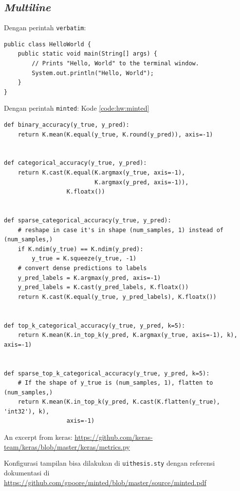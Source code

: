     \subsection{\textit{Multiline}}

    Dengan perintah \verb|verbatim|:

    \begin{verbatim}	
public class HelloWorld {
    public static void main(String[] args) {
        // Prints "Hello, World" to the terminal window.
        System.out.println("Hello, World");
    }
}
\end{verbatim}

    Dengan perintah \verb|minted|: Kode \ref{code:hw:minted}
    \begin{listing}[H]
        \begin{verbatim}
def binary_accuracy(y_true, y_pred):
    return K.mean(K.equal(y_true, K.round(y_pred)), axis=-1)


def categorical_accuracy(y_true, y_pred):
    return K.cast(K.equal(K.argmax(y_true, axis=-1),
                          K.argmax(y_pred, axis=-1)),
                  K.floatx())


def sparse_categorical_accuracy(y_true, y_pred):
    # reshape in case it's in shape (num_samples, 1) instead of (num_samples,)
    if K.ndim(y_true) == K.ndim(y_pred):
        y_true = K.squeeze(y_true, -1)
    # convert dense predictions to labels
    y_pred_labels = K.argmax(y_pred, axis=-1)
    y_pred_labels = K.cast(y_pred_labels, K.floatx())
    return K.cast(K.equal(y_true, y_pred_labels), K.floatx())


def top_k_categorical_accuracy(y_true, y_pred, k=5):
    return K.mean(K.in_top_k(y_pred, K.argmax(y_true, axis=-1), k), axis=-1)


def sparse_top_k_categorical_accuracy(y_true, y_pred, k=5):
    # If the shape of y_true is (num_samples, 1), flatten to (num_samples,)
    return K.mean(K.in_top_k(y_pred, K.cast(K.flatten(y_true), 'int32'), k),
                  axis=-1)
    \end{verbatim}
        \caption{An excerpt from keras: \url{https://github.com/keras-team/keras/blob/master/keras/metrics.py}}
        \label{code:hw:minted}
    \end{listing}

    Konfigurasi tampilan bisa dilakukan di \verb|uithesis.sty| dengan referensi dokumentasi di \url{https://github.com/gpoore/minted/blob/master/source/minted.pdf}

\fi
